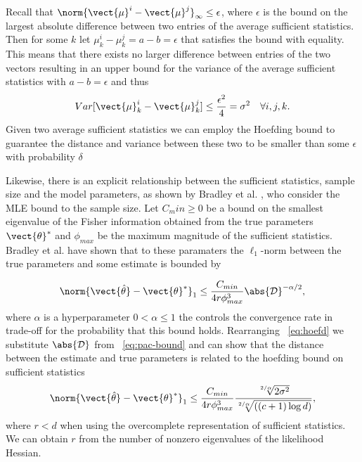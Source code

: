 

Recall that $\norm{\vect{\mu}^{i} -  \vect{\mu}^{j}}_\infty \leq  \epsilon$, where $\epsilon$ is the bound on the largest absolute difference between two entries of the average sufficient statistics. 
Then for some $k$ let  $\mu^{i}_k - \mu^{j}_k = a - b  = \epsilon$ that satisfies the bound with equality.
This means that there exists no larger difference between entries of the two vectors resulting in an upper bound for the variance of the average sufficient statistics with $a - b = \epsilon$ and thus
\begin{equation*}
    Var[\vect{\mu}^{i}_k -  \vect{\mu}^{j}_k] \leq \frac{\epsilon^2}{4} = \sigma^2 \quad \forall i,j,k.
\end{equation*}
Given two average sufficient statistics we can employ the Hoefding bound to guarantee the distance and variance between these two to be smaller than some $\epsilon$ with probability $\delta$

Likewise, there is an explicit relationship between the sufficient statistics, sample size and the model parameters, as shown by Bradley et al. \cite{bradley2012sample}, who consider the MLE bound \wrt to the sample size. 
Let $C_min \geq 0$ be a bound on the smallest eigenvalue of the Fisher information obtained from the true parameters $\vect{\theta}^*$ and $\phi_{max}$ be the maximum magnitude of the sufficient statistics. 
Bradley et al. have shown that \wrt to these paramaters the $\ell_1$-norm between the true parameters and some estimate is bounded by 

\begin{equation}
    \label{eq:pac-bound}
    \norm{\vect{\hat{\theta}}- \vect{\theta}^*}_1 \leq \frac{C_{min}}{4r\phi^3_{max}} \abs{\mathcal{D}}^{-\alpha/2},
\end{equation}
where $\alpha$ is a hyperparameter $0 < \alpha \leq 1$ the controls the convergence rate in trade-off for the probability that this bound holds. 
Rearranging \eq~\ref{eq:hoefd} we substitute $\abs{\mathcal{D}}$ from \eq~\ref{eq:pac-bound} and can show that the distance between the estimate and true parameters is related to the hoefding bound on sufficient statistics
\begin{equation}
    \norm{\vect{\hat{\theta}}- \vect{\theta}^*}_1 \leq \frac{C_{min}}{4r\phi^3_{max}} \frac{\sqrt[2/\alpha]{2\sigma^2}}{\sqrt[2/\alpha]{((c+1) \log d)}},
\end{equation}
where $r < d$ when using the overcomplete representation of sufficient statistics.
We can obtain $r$ from the number of nonzero eigenvalues of the likelihood Hessian.

